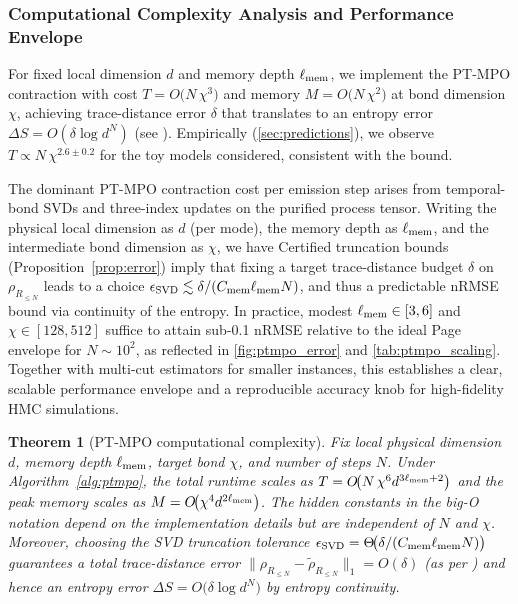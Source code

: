 \documentclass[aps,prd,preprint,onecolumn,superscriptaddress,nofootinbib,longbibliography,floatfix,11pt,showpacs,showkeys]{revtex4-2}
\newcommand{\HMC}{\textsc{HMC}\xspace}
\theoremstyle{plain}
\newtheorem{theorem}{Theorem}
\theoremstyle{definition}
\theoremstyle{remark}
\begin{document}
\subsubsection{Computational Complexity Analysis and Performance Envelope}
For fixed local dimension $d$ and memory depth $\ell_{\rm mem}$, we implement the PT-MPO contraction with cost $T=O\!\big(N\,\chi^3\big)$ and memory $M=O\!\big(N\,\chi^2\big)$ at bond dimension $\chi$, achieving trace-distance error $\delta$ that translates to an entropy error $\Delta S=O(\delta\log d^N)$ (see ). Empirically (\cref{sec:predictions}), we observe $T\propto N\,\chi^{2.6\pm0.2}$ for the toy models considered, consistent with the bound.

The dominant PT-MPO contraction cost per emission step arises from temporal-bond SVDs and three-index updates on the purified process tensor. Writing the physical local dimension as $d$ (per mode), the memory depth as $\ell_{\rm mem}$, and the intermediate bond dimension as $\chi$, we have
Certified truncation bounds (Proposition~\ref{prop:error}) imply that fixing a target trace-distance budget $\delta$ on $\rho_{R_{\le N}}$ leads to a choice $\epsilon_{\rm SVD}\lesssim \delta/(C_{\rm mem}\ell_{\rm mem} N)$, and thus a predictable nRMSE bound via continuity of the entropy. In practice, modest $\ell_{\rm mem}\in[3,6]$ and $\chi\in[128,512]$ suffice to attain sub-0.1 nRMSE relative to the ideal Page envelope for $N\sim 10^2$, as reflected in \cref{fig:ptmpo_error} and \cref{tab:ptmpo_scaling}. Together with multi-cut estimators for smaller instances, this establishes a clear, scalable performance envelope and a reproducible accuracy knob for high-fidelity \HMC{} simulations.

\begin{theorem}[PT-MPO computational complexity]\label{thm:ptmpo-complexity}
Fix local physical dimension $d$, memory depth $\ell_{\rm mem}$, target bond $\chi$, and number of steps $N$. Under Algorithm~\ref{alg:ptmpo}, the total runtime scales as $T=O\!\big(N\,\chi^6 d^{3\ell_{\rm mem}+2}\big)$ and the peak memory scales as $M=O\!\big(\chi^4 d^{2\ell_{\rm mem}}\big)$. The hidden constants in the big-O notation depend on the implementation details but are independent of $N$ and $\chi$. Moreover, choosing the SVD truncation tolerance $\epsilon_{\rm SVD}=\Theta\!\big(\delta/(C_{\rm mem}\ell_{\rm mem} N)\big)$ guarantees a total trace-distance error $\|\rho_{R_{\le N}}-\tilde\rho_{R_{\le N}}\|_1=O(\delta)$ (as per ) and hence an entropy error $\Delta S=O\!\big(\delta\log d^N\big)$ by entropy continuity. 
\end{theorem}
\end{document}
